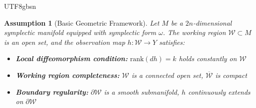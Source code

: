 \documentclass[a4paper,12pt]{extarticle}
\newtheorem{assumption}{Assumption}
\theoremstyle{definition}
\begin{document}
\begin{CJK}{UTF8}{gbsn}
\begin{assumption}[Basic Geometric Framework]
Let $M$ be a $2n$-dimensional symplectic manifold equipped with symplectic form $\omega$. The working region $\mathcal{W} \subset M$ is an open set, and the observation map $h: \mathcal{W} \to Y$ satisfies:
\begin{itemize}
\item[(1)] \textbf{Local diffeomorphism condition:} $\text{rank}(dh) = k$ holds constantly on $\mathcal{W}$
\item[(2)] \textbf{Working region completeness:} $\mathcal{W}$ is a connected open set, $\overline{\mathcal{W}}$ is compact
\item[(3)] \textbf{Boundary regularity:} $\partial \mathcal{W}$ is a smooth submanifold, $h$ continuously extends on $\partial \mathcal{W}$
\end{itemize}
\end{assumption}



\end{CJK}
\end{document}
